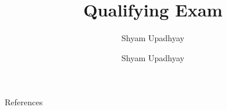 

\author{Shyam Upadhyay}
\title{Qualifying Exam}

\date{Shyam Upadhyay} 



\begin{frame}
\titlepage
\end{frame}






\begin{frame}[allowframebreaks]{References}
\def\newblock{}


\end{frame}


